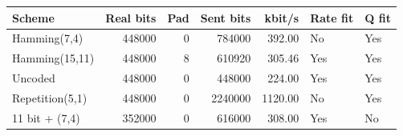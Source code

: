 \begin{tabular}{lrrrrll}
\toprule
Scheme & Real bits & Pad & Sent bits & kbit/s & Rate fit & Q fit \\
\midrule
Hamming(7,4) & 448000 & 0 & 784000 & 392.00 & No & Yes \\
Hamming(15,11) & 448000 & 8 & 610920 & 305.46 & Yes & Yes \\
Uncoded & 448000 & 0 & 448000 & 224.00 & Yes & Yes \\
Repetition(5,1) & 448000 & 0 & 2240000 & 1120.00 & No & Yes \\
11 bit + (7,4) & 352000 & 0 & 616000 & 308.00 & Yes & No \\
\bottomrule
\end{tabular}
